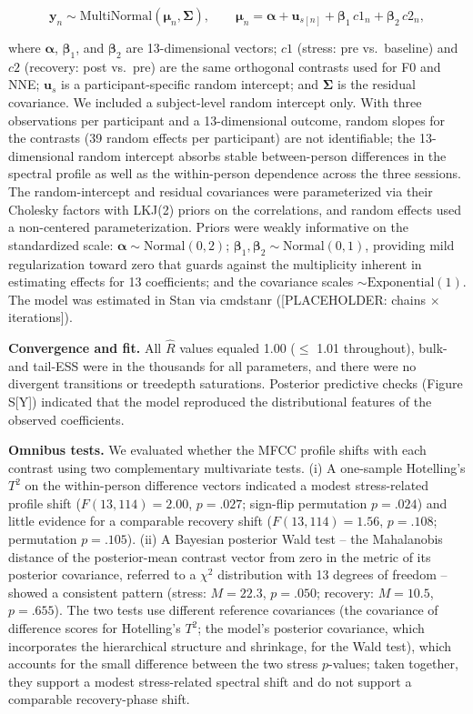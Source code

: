 \documentclass[
  english,
  man,floatsintext]{apa6}
\begin{document}
\[\mathbf{y}_n \sim \text{MultiNormal}(\boldsymbol{\mu}_n, \boldsymbol{\Sigma}), \qquad \boldsymbol{\mu}_n = \boldsymbol{\alpha} + \mathbf{u}_{s[n]} + \boldsymbol{\beta}_1\, c1_n + \boldsymbol{\beta}_2\, c2_n,\]

where \(\boldsymbol{\alpha}\), \(\boldsymbol{\beta}_1\), and \(\boldsymbol{\beta}_2\) are 13-dimensional vectors; \(c1\) (stress: pre vs.~baseline) and \(c2\) (recovery: post vs.~pre) are the same orthogonal contrasts used for F0 and NNE; \(\mathbf{u}_s\) is a participant-specific random intercept; and \(\boldsymbol{\Sigma}\) is the residual covariance. We included a subject-level random intercept only. With three observations per participant and a 13-dimensional outcome, random slopes for the contrasts (39 random effects per participant) are not identifiable; the 13-dimensional random intercept absorbs stable between-person differences in the spectral profile as well as the within-person dependence across the three sessions. The random-intercept and residual covariances were parameterized via their Cholesky factors with LKJ(2) priors on the correlations, and random effects used a non-centered parameterization. Priors were weakly informative on the standardized scale: \(\boldsymbol{\alpha} \sim \text{Normal}(0, 2)\); \(\boldsymbol{\beta}_1, \boldsymbol{\beta}_2 \sim \text{Normal}(0, 1)\), providing mild regularization toward zero that guards against the multiplicity inherent in estimating effects for 13 coefficients; and the covariance scales \(\sim \text{Exponential}(1)\). The model was estimated in Stan via cmdstanr ({[}PLACEHOLDER: chains \(\times\) iterations{]}).

\textbf{Convergence and fit.} All \(\hat{R}\) values equaled 1.00 (\(\leq\) 1.01 throughout), bulk- and tail-ESS were in the thousands for all parameters, and there were no divergent transitions or treedepth saturations. Posterior predictive checks (Figure S{[}Y{]}) indicated that the model reproduced the distributional features of the observed coefficients.

\textbf{Omnibus tests.} We evaluated whether the MFCC profile shifts with each contrast using two complementary multivariate tests. (i) A one-sample Hotelling's \(T^2\) on the within-person difference vectors indicated a modest stress-related profile shift (\(F(13, 114) = 2.00\), \(p = .027\); sign-flip permutation \(p = .024\)) and little evidence for a comparable recovery shift (\(F(13, 114) = 1.56\), \(p = .108\); permutation \(p = .105\)). (ii) A Bayesian posterior Wald test -- the Mahalanobis distance of the posterior-mean contrast vector from zero in the metric of its posterior covariance, referred to a \(\chi^2\) distribution with 13 degrees of freedom -- showed a consistent pattern (stress: \(M = 22.3\), \(p = .050\); recovery: \(M = 10.5\), \(p = .655\)). The two tests use different reference covariances (the covariance of difference scores for Hotelling's \(T^2\); the model's posterior covariance, which incorporates the hierarchical structure and shrinkage, for the Wald test), which accounts for the small difference between the two stress \(p\)-values; taken together, they support a modest stress-related spectral shift and do not support a comparable recovery-phase shift.
\end{document}
